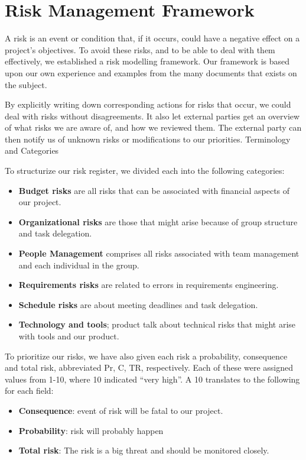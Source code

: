 \section{Risk Management Framework}
A risk is an event or condition that, if it occurs, could have a
negative effect on a project's objectives. To avoid these risks, and to be
able to deal with them effectively, we established a risk modelling framework.
Our framework is based upon our own experience and examples from the many
documents that exists on the subject.

By explicitly writing down corresponding actions for risks that occur,
we could deal with risks without disagreements. It also let external
parties get an overview of what risks we are aware of, and how we
reviewed them. The external party can then notify us of unknown risks
or modifications to our priorities. 
Terminology and Categories

To structurize our risk register, we divided each into the following
categories:
\begin{itemize}
    \item \textbf{Budget risks} are all risks that can be associated with
        financial aspects of our project.
    \item \textbf{Organizational risks} are those that might arise because of
    group structure and task delegation.
    \item \textbf{People Management} comprises all risks associated with team
        management and each individual in the group.
    \item \textbf{Requirements risks} are related to errors in requirements
        engineering.
    \item \textbf{Schedule risks} are about meeting deadlines and task
        delegation.
    \item \textbf{Technology and tools}; product talk about technical risks that
        might arise with tools and our product.
\end{itemize}

To prioritize our risks, we have also given each risk a probability,
consequence and total risk, abbreviated Pr, C, TR, respectively. Each
of these were assigned values from 1-10, where 10 indicated
``very high''. A 10 translates to
the following for each field:
\begin{itemize}
    \item \textbf{Consequence}: event of risk will be fatal to our project.
    \item \textbf{Probability}: risk will probably happen
    \item \textbf{Total risk}: The risk is a big threat and should be monitored closely.
\end{itemize}

